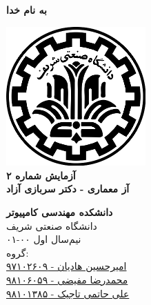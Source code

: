 \documentclass{article}
\begin{document}
\begin{titlepage}
	\begin{center}
		\textbf{ \Huge{به نام خدا}}
	
		\vspace{0.2cm}		
		\includegraphics[width=0.4\textwidth]{sharif.png}\\
		\vspace{0.2cm}
		\textbf{ \Huge{آزمایش شماره ۲}}\\
		\vspace{0.25cm}
		\textbf{ \Large{آز معماری - دکتر سربازی آزاد}}
		\vspace{0.2cm}
		
		
		\large \textbf{دانشکده مهندسی کامپیوتر}\\\vspace{0.1cm}
		\large   دانشگاه صنعتی شریف\\\vspace{0.2cm}
		\large   ﻧﯿﻢ‌سال اول ۰۰-۰۱ \\\vspace{0.10cm}
		\large{گروه:}\\
		\large{\href{mailto:a.h.hadian@gmail.com}{امیرحسین هادیان - ۹۷۱۰۲۶۰۹}}\\
		\large{\href{mailto:mofayezi.m@gmail.com}{محمدرضا مفیضی - ۹۸۱۰۶۰۵۹}}\\
		\large{\href{mailto:a.hatam008@gmail.com}{علی حاتمی تاجیک - ۹۸۱۰۱۳۸۵}}\\
	\end{center}
\end{titlepage}

\newpage

\pagestyle{fancy}
\fancyhf{}
\fancyfoot{}
\setlength{\headheight}{59pt}
\cfoot{\thepage}
\end{document}
